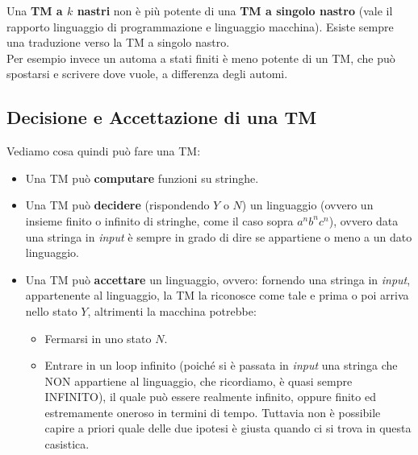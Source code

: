 Una \textbf{TM a $k$ nastri} non è più potente di una \textbf{TM a singolo
  nastro} (vale il rapporto linguaggio di programmazione e linguaggio
macchina). Esiste sempre una traduzione verso la TM a singolo nastro.\\
Per esempio invece un automa a stati finiti è meno potente di un TM, che può
spostarsi e scrivere dove vuole, a differenza degli automi.\\
\subsection{Decisione e Accettazione di una TM}
Vediamo cosa quindi può fare una TM:
\begin{itemize}
  \item Una TM può \textbf{computare} funzioni su stringhe.
  \item Una TM può \textbf{decidere} (rispondendo $Y$ o $N$) un linguaggio
  (ovvero un insieme finito o infinito di stringhe, come il caso sopra
  $a^nb^nc^n$), ovvero data una stringa in \textit{input} è sempre in grado di dire se  appartiene o meno a un dato linguaggio.
  \item Una TM può \textbf{accettare} un linguaggio, ovvero: fornendo una stringa in \textit{input}, appartenente al linguaggio, la TM la riconosce come tale e prima o poi arriva nello stato $Y$, altrimenti la macchina potrebbe:
  \begin{itemize}
    \item Fermarsi in uno stato $N$.
    \item Entrare in un loop infinito (poiché si è passata in \textit{input} una stringa che NON appartiene al linguaggio, che ricordiamo, è quasi sempre INFINITO), il quale può essere realmente infinito, oppure finito ed estremamente oneroso in termini di tempo. Tuttavia non è possibile capire a priori quale delle due ipotesi è giusta quando ci si trova in questa casistica.
  \end{itemize}
\end{itemize}
